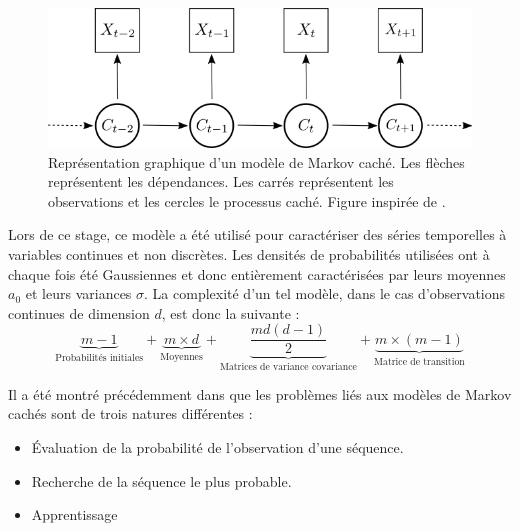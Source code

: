 \documentclass[12pt, french]{report}
\begin{document}
\begin{figure}[ht]
	\begin{center}
		\includegraphics[width= 0.6 \textwidth]{Images/Models/HMM/HMM.png}
		\caption{Représentation graphique d'un modèle de Markov caché. Les flèches représentent les dépendances. Les carrés représentent les observations et les cercles le processus caché. Figure inspirée de \cite{zucchini_hidden_2017}.}
		\label{fig::HMM:HMM_Graph}
	\end{center}
\end{figure}


Lors de ce stage, ce modèle a été utilisé pour caractériser des séries temporelles à variables continues et non discrètes. Les densités de probabilités utilisées ont à chaque fois été Gaussiennes et donc entièrement caractérisées par leurs moyennes $a_0$ et leurs variances $\sigma$. La complexité d'un tel modèle, dans le cas d'observations continues de dimension $d$, est donc la suivante :
\begin{equation}
\underbrace{m-1}_\text{Probabilités initiales}  + \underbrace{m \times d}_\text{Moyennes}  +  \underbrace{\frac{md \left(d - 1\right)}{2}}_\text{Matrices de variance covariance} + \underbrace{m \times (m-1)}_\text{Matrice de transition}
\label{eq:Model_HMM_ParamNumber} 
\end{equation}

Il a été montré précédemment dans \cite{rabiner_tutorial_1989} que les problèmes liés aux modèles de Markov cachés sont de trois natures différentes : 
\begin{itemize}
	\item Évaluation de la probabilité de l’observation d’une séquence.
	\item Recherche de la séquence le plus probable.
	\item Apprentissage
\end{itemize}
\end{document}
